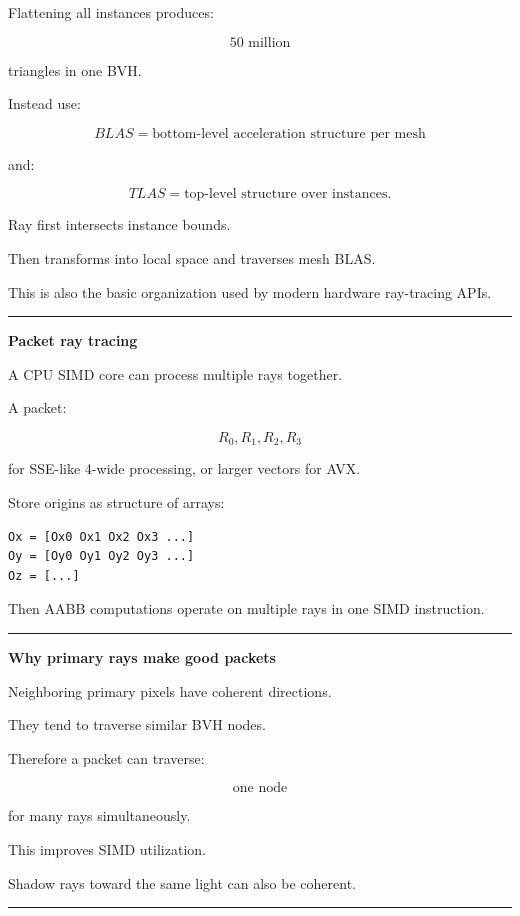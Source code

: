 Flattening all instances produces:

\[
50\text{ million}
\]

triangles in one BVH.

Instead use:

\[
\boxed{
BLAS=\text{bottom-level acceleration structure per mesh}
}
\]

and:

\[
\boxed{
TLAS=\text{top-level structure over instances}.
}
\]

Ray first intersects instance bounds.

Then transforms into local space and traverses mesh BLAS.

This is also the basic organization used by modern hardware ray-tracing APIs.

\begin{center}\rule{0.5\linewidth}{0.5pt}\end{center}

\textbf{Packet ray tracing}

A CPU SIMD core can process multiple rays together.

A packet:

\[
R_0,R_1,R_2,R_3
\]

for SSE-like 4-wide processing, or larger vectors for AVX.

Store origins as structure of arrays:

\begin{verbatim}
Ox = [Ox0 Ox1 Ox2 Ox3 ...]
Oy = [Oy0 Oy1 Oy2 Oy3 ...]
Oz = [...]
\end{verbatim}

Then AABB computations operate on multiple rays in one SIMD instruction.

\begin{center}\rule{0.5\linewidth}{0.5pt}\end{center}

\textbf{Why primary rays make good packets}

Neighboring primary pixels have coherent directions.

They tend to traverse similar BVH nodes.

Therefore a packet can traverse:

\[
\text{one node}
\]

for many rays simultaneously.

This improves SIMD utilization.

Shadow rays toward the same light can also be coherent.

\begin{center}\rule{0.5\linewidth}{0.5pt}\end{center}

